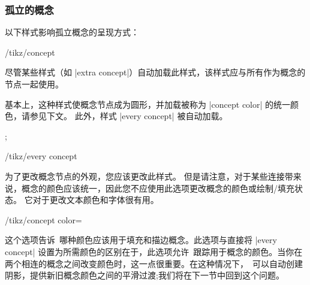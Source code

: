 \subsubsection{孤立的概念}


以下样式影响孤立概念的呈现方式：

\begin{stylekey}{/tikz/concept}

    尽管某些样式（如 |extra concept|）自动加载此样式，该样式应与所有作为概念的节点一起使用。


    基本上，这种样式使概念节点成为圆形，并加载被称为 |concept color| 的统一颜色，请参见下文。 此外，样式 |every concept| 被自动加载。
\begin{codeexample}[preamble={\usetikzlibrary{mindmap}}]
\tikz[mindmap,concept color=red!50] ;
\end{codeexample}

    \begin{stylekey}{/tikz/every concept}

        为了更改概念节点的外观，您应该更改此样式。 但是请注意，对于某些连接带来说，概念的颜色应该统一，因此您不应使用此选项更改概念的颜色或绘制/填充状态。 它对于更改文本颜色和字体很有用。
    \end{stylekey}

    \begin{key}{/tikz/concept color=}

        这个选项告诉\tikzname\ 哪种颜色应该用于填充和描边概念。此选项与直接将 |every concept| 设置为所需颜色的区别在于，此选项允许\tikzname\ 跟踪用于概念的颜色。当你在两个相连的概念之间改变颜色时，这一点很重要。在这种情况下，\tikzname\ 可以自动创建阴影，提供新旧概念颜色之间的平滑过渡;我们将在下一节中回到这个问题。
    \end{key}
\end{stylekey}


